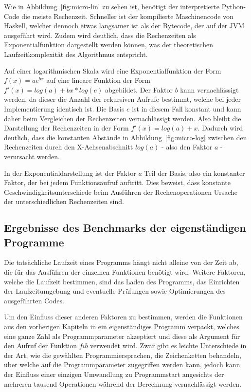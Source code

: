 \documentclass[11pt, parskip=half]{scrartcl}       %
\begin{document}
Wie in Abbildung~\ref{fig:micro-lin} zu sehen ist, benötigt der interpretierte Python-Code die meiste Rechenzeit.
Schneller ist der kompilierte Maschinencode von Haskell, welcher dennoch etwas langsamer ist als der Bytecode, der auf der JVM ausgeführt wird.
Zudem wird deutlich, dass die Rechenzeiten als Exponentialfunktion dargestellt werden können, was der theoretischen Laufzeitkomplexität des Algorithmus entspricht.

Auf einer logarithmischen Skala wird eine Exponentialfunktion der Form $f(x) = ae^{bx}$ auf eine lineare Funktion der Form $f'(x) = log(a) + bx * log(e)$ abgebildet.
Der Faktor $b$ kann vernachlässigt werden, da dieser die Anzahl der rekursiven Aufrufe bestimmt, welche bei jeder Implementierung identisch ist.
Die Basis $e$ ist in diesem Fall konstant und kann daher beim Vergleichen der Rechenzeiten vernachlässigt werden.
Also bleibt die Darstellung der Rechenzeiten in der Form $f'(x) = log(a) + x$.
Dadurch wird deutlich, dass die konstanten Abstände in Abbildung~\ref{fig:micro-log} zwischen den Rechenzeiten durch den X-Achsenabschnitt $log(a)$ - also den Faktor $a$ - verursacht werden.

In der Exponentialdarstellung ist der Faktor $a$ Teil der Basis, also ein konstanter Faktor, der bei jedem Funktionsaufruf auftritt.
Dies beweist, dass konstante Geschwindigkeitsunterschiede beim Ausführen der Rechenoperationen Ursache der unterschiedlichen Rechenzeiten sind.

\subsection{Ergebnisse des Benchmarks der eigenständigen Programme}

Die tatsächliche Laufzeit eines Programms hängt nicht alleine von der Zeit ab, die für das Ausführen der einzelnen Funktionen benötigt wird.
Weitere Faktoren, welche die Laufzeit bestimmen, sind das Laden des Programms, das Einrichten der Laufzeitumgebung und eventuelle Prüfungen sowie Optimierungen des ausgeführten Codes.

Um den Einfluss dieser anderen Faktoren zu bestimmen, werden die Funktionen aus den vorherigen Kapiteln in ein eigenständiges Programm verpackt, welches eine ganze Zahl als Programmparameter akzeptiert und diese als Argument für den Aufruf der Funktion $fib$ verwendet wird.
Zwar gibt es leichte Unterschiede in der Art, wie die gewählten Programmiersprachen, die Zeichenketten behandeln, über welche auf die Programmparameter zugegriffen werden kann, jedoch kann der Einfluss einer einzigen Umwandlung zu Programmstart angesichts der mehreren tausend Operationen während der Berechnung vernachlässigt werden.
\end{document}
